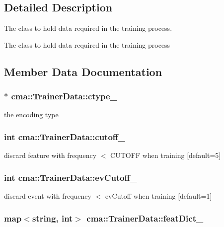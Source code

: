 \subsection{Detailed Description}
The class to hold data required in the training process. 

The class to hold data required in the training process 

\subsection{Member Data Documentation}
\subsubsection[{ctype\_\-}]{$\ast$ {\bf cma::TrainerData::ctype\_\-}}\label{classcma_1_1TrainerData_a415bd191302d39887f15f1511392ab3}


the encoding type 
\subsubsection[{cutoff\_\-}]{\setlength{\rightskip}{0pt plus 5cm}int {\bf cma::TrainerData::cutoff\_\-}}\label{classcma_1_1TrainerData_23c70e451c8ba9cf53e2eccec8fc421d}


discard feature with frequency $<$ CUTOFF when training [default=5] 
\subsubsection[{evCutoff\_\-}]{\setlength{\rightskip}{0pt plus 5cm}int {\bf cma::TrainerData::evCutoff\_\-}}\label{classcma_1_1TrainerData_22eca27d2b88fc89251ed74fa9b1a255}


discard event with frequency $<$ evCutoff when training [default=1] 
\subsubsection[{featDict\_\-}]{\setlength{\rightskip}{0pt plus 5cm}map$<$string, int$>$ {\bf cma::TrainerData::featDict\_\-}}\label{classcma_1_1TrainerData_565db4b9101b4c17c9a6f8530a19d2f6}


